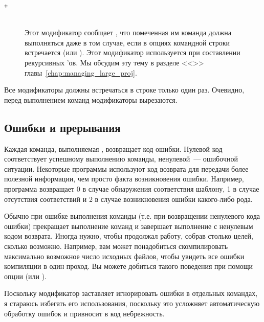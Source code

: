 \begin{description}
\item[\texttt{+}] \hfill \\
Этот модификатор сообщает \GNUmake{}, что помеченная им команда должна
выполняться даже в том случае, если в опциях командной строки
встречается  (или ). Этот
модификатор используется при составлении рекурсивных \Makefile{}'ов.
Мы обсудим эту тему в разделе <<>>
главы~\ref{chap:managing_large_proj}.
\end{description}

Все модификаторы должны встречаться в строке только один раз.
Очевидно, перед выполнением команд модификаторы вырезаются.

\subsection{Ошибки и прерывания}

Каждая команда, выполняемая \GNUmake{}, возвращает код ошибки. Нулевой
код соответствует успешному выполнению команды, ненулевой~--- ошибочной
ситуации. Некоторые программы используют код возврата для передачи
более полезной информации, чем просто факта возникновения ошибки.
Например, программа  возвращает 0 в случае обнаружения
соответствия шаблону, 1 в случае отсутствия соответствий и 2 в случае
возникновения ошибки какого-либо рода.

Обычно при ошибке выполнения команды (т.е. при возвращении ненулевого
кода ошибки) \GNUmake{} прекращает выполнение команд и завершает
выполнение с ненулевым кодом возврата. Иногда нужно, чтобы \GNUmake{}
продолжал работу, собрав столько целей, сколько возможно. Например,
вам может понадобиться скомпилировать максимально возможное число
исходных файлов, чтобы увидеть все ошибки компиляции в один проход.
Вы можете добиться такого поведения при помощи опции
 (или ).

Поскольку модификатор \command{-} заставляет \GNUmake{} игнорировать
ошибки в отдельных командах, я стараюсь избегать его использования,
поскольку это усложняет автоматическую обработку ошибок и привносит в
код небрежность.

